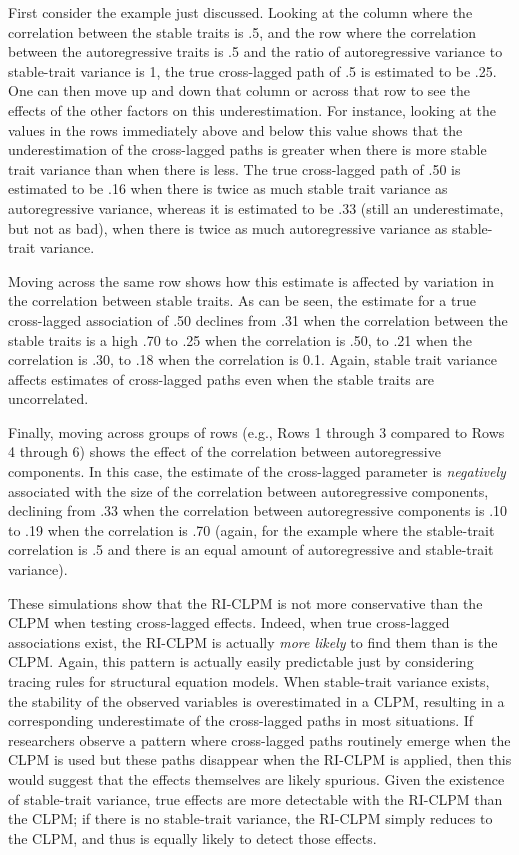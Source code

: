 \documentclass[
  english,
  man,floatsintext]{apa6}
\begin{document}
First consider the example just discussed. Looking at the column where the correlation between the stable traits is .5, and the row where the correlation between the autoregressive traits is .5 and the ratio of autoregressive variance to stable-trait variance is 1, the true cross-lagged path of .5 is estimated to be .25. One can then move up and down that column or across that row to see the effects of the other factors on this underestimation. For instance, looking at the values in the rows immediately above and below this value shows that the underestimation of the cross-lagged paths is greater when there is more stable trait variance than when there is less. The true cross-lagged path of .50 is estimated to be .16 when there is twice as much stable trait variance as autoregressive variance, whereas it is estimated to be .33 (still an underestimate, but not as bad), when there is twice as much autoregressive variance as stable-trait variance.

Moving across the same row shows how this estimate is affected by variation in the correlation between stable traits. As can be seen, the estimate for a true cross-lagged association of .50 declines from .31 when the correlation between the stable traits is a high .70 to .25 when the correlation is .50, to .21 when the correlation is .30, to .18 when the correlation is 0.1. Again, stable trait variance affects estimates of cross-lagged paths even when the stable traits are uncorrelated.

Finally, moving across groups of rows (e.g., Rows 1 through 3 compared to Rows 4 through 6) shows the effect of the correlation between autoregressive components. In this case, the estimate of the cross-lagged parameter is \emph{negatively} associated with the size of the correlation between autoregressive components, declining from .33 when the correlation between autoregressive components is .10 to .19 when the correlation is .70 (again, for the example where the stable-trait correlation is .5 and there is an equal amount of autoregressive and stable-trait variance).

These simulations show that the RI-CLPM is not more conservative than the CLPM when testing cross-lagged effects. Indeed, when true cross-lagged associations exist, the RI-CLPM is actually \emph{more likely} to find them than is the CLPM. Again, this pattern is actually easily predictable just by considering tracing rules for structural equation models. When stable-trait variance exists, the stability of the observed variables is overestimated in a CLPM, resulting in a corresponding underestimate of the cross-lagged paths in most situations. If researchers observe a pattern where cross-lagged paths routinely emerge when the CLPM is used but these paths disappear when the RI-CLPM is applied, then this would suggest that the effects themselves are likely spurious. Given the existence of stable-trait variance, true effects are more detectable with the RI-CLPM than the CLPM; if there is no stable-trait variance, the RI-CLPM simply reduces to the CLPM, and thus is equally likely to detect those effects.
\end{document}
